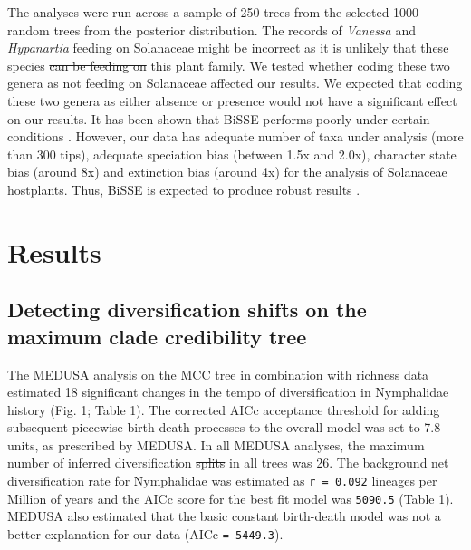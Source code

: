 \documentclass[10pt]{article}
\providecommand{\DIFaddtex}[1]{{\protect\color{blue}\uwave{#1}}} %
\providecommand{\DIFdeltex}[1]{{\protect\color{red}\sout{#1}}}                      %
\providecommand{\DIFaddbegin}{} %
\providecommand{\DIFaddend}{} %
\providecommand{\DIFdelbegin}{} %
\providecommand{\DIFdelend}{} %
\providecommand{\DIFadd}[1]{\texorpdfstring{\DIFaddtex{#1}}{#1}} %
\providecommand{\DIFdel}[1]{\texorpdfstring{\DIFdeltex{#1}}{}} %
\begin{document}
The analyses were run across a sample of 250
trees from the selected 1000 random trees from the posterior
distribution. The records of \emph{Vanessa} and \emph{Hypanartia}
feeding on Solanaceae \cite{beccaloni2008, scott1986} might be incorrect as it is unlikely
that these species \DIFdelbegin \DIFdel{can be feeding on }\DIFdelend \DIFaddbegin \DIFadd{are able to feed on members of }\DIFaddend this plant family. We tested
whether coding these two genera as not feeding on Solanaceae affected
our results. We expected that coding these two genera as either absence
or presence would not have a significant effect on our results. It has
been shown that BiSSE performs poorly under certain conditions \cite{davis2013}.
However, our data has adequate number of taxa under analysis (more than
300 tips), adequate speciation bias (between 1.5x and 2.0x), character
state bias (around 8x) and extinction bias (around 4x) for the analysis
of Solanaceae hostplants. Thus, BiSSE is expected to produce robust
results \cite{davis2013}.

\section*{Results}

\subsection*{Detecting diversification shifts on the maximum clade
credibility tree}

The MEDUSA analysis on the MCC tree in combination with richness data
estimated 18 significant changes in the tempo of diversification in
Nymphalidae history (Fig. 1; Table 1). The corrected AICc acceptance
threshold for adding subsequent piecewise birth-death processes to the
overall model was set to 7.8 units, as prescribed by MEDUSA. In all
MEDUSA analyses, the maximum number of inferred diversification \DIFdelbegin \DIFdel{splits
}\DIFdelend \DIFaddbegin \DIFadd{shifts
}\DIFaddend in all trees was 26. The background net diversification rate for
Nymphalidae was estimated as \texttt{r = 0.092} lineages per Million of
years and the AICc score for the best fit model was \texttt{5090.5}
(Table 1). MEDUSA also estimated that the basic constant birth-death
model was not a better explanation for our data (AICc
\texttt{= 5449.3}).
\end{document}
